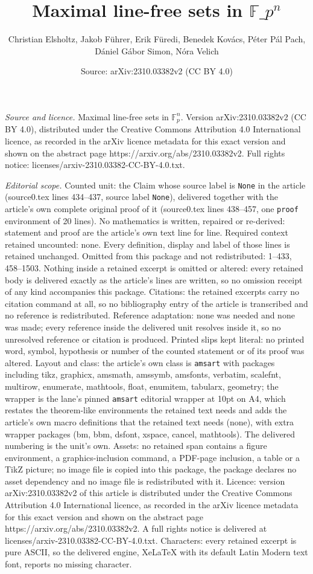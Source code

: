 \documentclass[10pt,a4paper]{amsart}
\title[Maximal line-free sets in $\mathbb{F}\_p^n$]{Maximal line-free sets in $\mathbb{F}\_p^n$}
\author{Christian Elsholtz, Jakob F\"uhrer, Erik F\"uredi, Benedek Kov\'acs, P\'eter P\'al Pach, D\'aniel G\'abor Simon, N\'ora Velich}
\date{Source: arXiv:2310.03382v2 (CC BY 4.0)}
\begin{document}
\maketitle

\noindent\emph{Source and licence.} Maximal line-free sets in $\mathbb{F}_p^n$. Version arXiv:2310.03382v2 (CC BY 4.0), distributed under the Creative Commons Attribution 4.0 International licence, as recorded in the arXiv licence metadata for this exact version and shown on the abstract page https://arxiv.org/abs/2310.03382v2. Full rights notice: licenses/arxiv-2310.03382-CC-BY-4.0.txt.\par\smallskip

\noindent\textit{Editorial scope.} Counted unit: the Claim whose source label is \texttt{None} in the article (source0.tex lines 434--437, source label \texttt{None}), delivered together with the article's own complete original proof of it (source0.tex lines 438--457, one \texttt{proof} environment of 20 lines). No mathematics is written, repaired or re-derived: statement and proof are the article's own text line for line. Required context retained uncounted: none. Every definition, display and label of those lines is retained unchanged. Omitted from this package and not redistributed: 1--433, 458--1503. Nothing inside a retained excerpt is omitted or altered: every retained body is delivered exactly as the article's lines are written, so no omission receipt of any kind accompanies this package. Citations: the retained excerpts carry no citation command at all, so no bibliography entry of the article is transcribed and no reference is redistributed. Reference adaptation: none was needed and none was made; every reference inside the delivered unit resolves inside it, so no unresolved reference or citation is produced. Printed slips kept literal: no printed word, symbol, hypothesis or number of the counted statement or of its proof was altered. Layout and class: the article's own class is \texttt{amsart} with packages including tikz, graphicx, amsmath, amssymb, amsfonts, verbatim, scalefnt, multirow, enumerate, mathtools, float, enumitem, tabularx, geometry; the wrapper is the lane's pinned \texttt{amsart} editorial wrapper at 10pt on A4, which restates the theorem-like environments the retained text needs and adds the article's own macro definitions that the retained text needs (none), with extra wrapper packages (bm, bbm, dsfont, xspace, cancel, mathtools). The delivered numbering is the unit's own. Assets: no retained span contains a figure environment, a graphics-inclusion command, a PDF-page inclusion, a table or a TikZ picture; no image file is copied into this package, the package declares no asset dependency and no image file is redistributed with it. Licence: version arXiv:2310.03382v2 of this article is distributed under the Creative Commons Attribution 4.0 International licence, as recorded in the arXiv licence metadata for this exact version and shown on the abstract page https://arxiv.org/abs/2310.03382v2. A full rights notice is delivered at licenses/arxiv-2310.03382-CC-BY-4.0.txt. Characters: every retained excerpt is pure ASCII, so the delivered engine, XeLaTeX with its default Latin Modern text font, reports no missing character.
\end{document}
